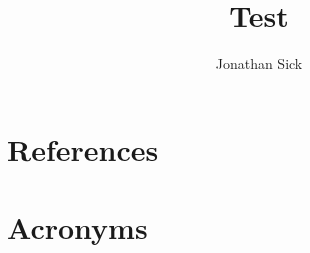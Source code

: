 \documentclass[DM,authoryear,toc]{lsstdoc}
\title{Test}
\author{%
Jonathan Sick
}
\date{\vcsDate}
\begin{document}
\maketitle


\appendix
\section{References} \label{sec:bib}
\renewcommand{\refname}{} %


\section{Acronyms} \label{sec:acronyms}

\end{document}
